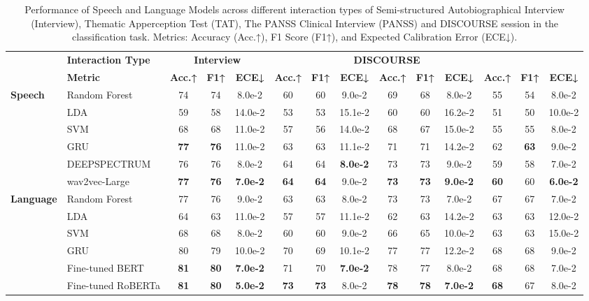 \documentclass[9pt,a4paper]{rho-class/rho}
\begin{document}
\begin{table*}[t]
\centering
{}  %
\begin{tabularx}{\textwidth}{lX|c>{\columncolor{LightBlue}}c>{\columncolor{LightBlue}}c|c>{\columncolor{LightBlue}}c>{\columncolor{LightBlue}}c|c>{\columncolor{LightBlue}}c>{\columncolor{LightBlue}}c|c>{\columncolor{LightBlue}}c>{\columncolor{LightBlue}}c}
\toprule
& \textbf{Interaction Type} & \multicolumn{3}{c}{ \textbf{Interview}} & \multicolumn{3}{c}{\textbf{TAT}} & \multicolumn{3}{c}{\textbf{PANSS}} & \multicolumn{3}{c}{\textbf{DISCOURSE}} \\
& \textbf{Metric} & \textbf{Acc.↑} & \textbf{F1↑} & \textbf{ECE↓} & \textbf{Acc.↑} & \textbf{F1↑} & \textbf{ECE↓} & \textbf{Acc.↑} & \textbf{F1↑} & \textbf{ECE↓} & \textbf{Acc.↑} & \textbf{F1↑} & \textbf{ECE↓} \\
\midrule
\textbf{Speech} & Random Forest & 74 & 74 & 8.0e-2 & 60 & 60 & 9.0e-2 & 69 & 68 & 8.0e-2 & 55 & 54 & 8.0e-2 \\
& LDA & 59 & 58 & 14.0e-2 & 53 & 53 & 15.1e-2 & 60 & 60 & 16.2e-2 & 51 & 50 & 10.0e-2 \\
& SVM & 68 & 68 & 11.0e-2 & 57 & 56 & 14.0e-2 & 68 & 67 & 15.0e-2 & 55 & 55 & 8.0e-2 \\
& GRU & \textbf{77} & \textbf{76} & 11.0e-2 & 63 & 63 & 11.1e-2 & 71 & 71 & 14.2e-2 & 62 & \textbf{63} & 9.0e-2 \\
& DEEPSPECTRUM & 76 & 76 & 8.0e-2 & 64 & 64 & \textbf{8.0e-2} & 73 & 73 & 9.0e-2 & 59 & 58 & 7.0e-2 \\
& wav2vec-Large & \textbf{77} & \textbf{76} & \textbf{7.0e-2} & \textbf{64} & \textbf{64} & 9.0e-2 & \textbf{73} & \textbf{73} & \textbf{9.0e-2} & \textbf{60} & 60 & \textbf{6.0e-2} \\
\midrule
\textbf{Language} & Random Forest & 77 & 76 & 9.0e-2 & 63 & 63 & 8.0e-2 & 73 & 73 & 7.0e-2 & 67 & 67 & 7.0e-2 \\
& LDA & 64 & 63 & 11.0e-2 & 57 & 57 & 11.1e-2 & 62 & 63 & 14.2e-2 & 63 & 63 & 12.0e-2 \\
& SVM & 68 & 68 & 8.0e-2 & 60 & 60 & 9.0e-2 & 66 & 65 & 10.0e-2 & 63 & 63 & 15.0e-2 \\
& GRU & 80 & 79 & 10.0e-2 & 70 & 69 & 10.1e-2 & 77 & 77 & 12.2e-2 & 68 & 68 & 9.0e-2 \\
& Fine-tuned BERT & \textbf{81} & \textbf{80} & \textbf{7.0e-2} & 71 & 70 & \textbf{7.0e-2} & 78 & 77 & 8.0e-2 & 68 & 68 & 7.0e-2 \\
& Fine-tuned RoBERTa & \textbf{81} & \textbf{80} & \textbf{5.0e-2} & \textbf{73} & \textbf{73} & 8.0e-2 & \textbf{78} & \textbf{78} & \textbf{7.0e-2} & \textbf{68} & 67 & 8.0e-2 \\
\bottomrule
\end{tabularx}
\caption{Performance of Speech and Language Models across different interaction types of Semi-structured Autobiographical Interview (Interview), Thematic Apperception Test (TAT), The PANSS Clinical Interview (PANSS) and DISCOURSE session in the classification task. Metrics: Accuracy (Acc.↑), F1 Score (F1↑), and Expected Calibration Error (ECE↓).}
\end{table*}
\end{document}
